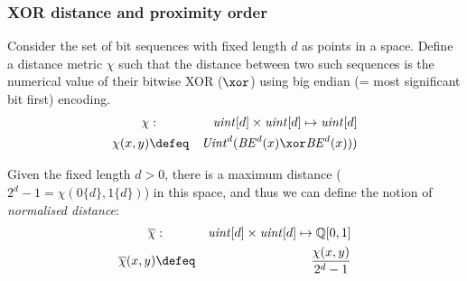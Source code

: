 



\subsubsection{XOR distance and proximity order\statusgreen}\label{sec:proximity}

\begin{definition}\label{def:xor}
Consider the set of bit sequences with fixed length $d$ as points in a space. 
Define a distance metric $\chi$ such that
the distance between two such sequences is the numerical value of their bitwise XOR ($\xor$) using big endian (= most significant bit first) encoding.
\begin{eqnarray}
\chi&:&\mathit{uint}[d] \times\mathit{uint}[d]\mapsto\mathit{uint}[d]\\
\chi(x, y) &\defeq& \mathit{Uint}^{d}(\mathit{BE}
^{d}(x)  \xor \mathit{BE}
^{d}(x)))
\end{eqnarray}

Given the fixed length $d>0$, there is a maximum distance ($2^d-1 = \chi(0\{d\},1\{d\})$) in this space, and thus we can define the notion of \emph{normalised distance}:
%
\begin{eqnarray}
\overline{\chi}&:& \mathit{uint}[d] \times\mathit{uint}[d]\mapsto\mathbb{Q}[0,1]\\
\overline{\chi}(x, y) &\defeq &\frac{\chi(x,y)}{2^d-1}
\end{eqnarray}
\end{definition}



